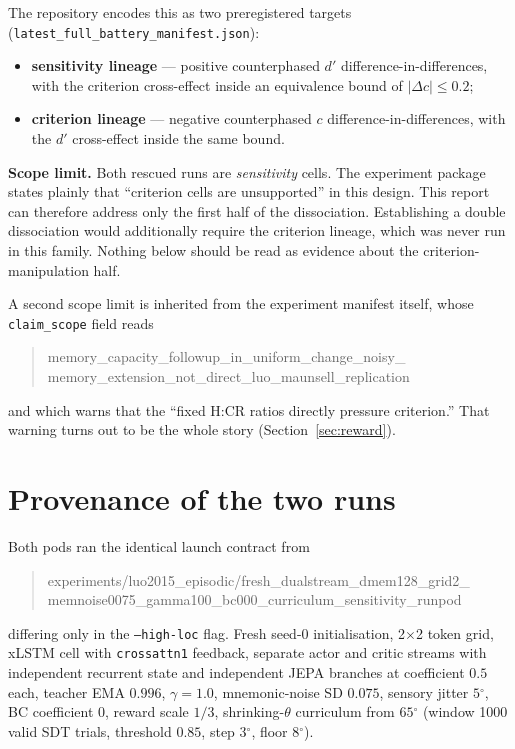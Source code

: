 \documentclass[11pt]{article}
\newcommand{\dprime}{d'}
\newcommand{\dc}{\Delta c}
\newcommand{\dg}{\ensuremath{^\circ}}
\begin{document}
The repository encodes this as two preregistered targets
(\texttt{latest\_full\_battery\_manifest.json}):

\begin{itemize}[leftmargin=1.4em,itemsep=1pt]
  \item \textbf{sensitivity lineage} --- positive counterphased $\dprime$
        difference-in-differences, with the criterion cross-effect inside an
        equivalence bound of $|\dc| \le 0.2$;
  \item \textbf{criterion lineage} --- negative counterphased $c$
        difference-in-differences, with the $\dprime$ cross-effect inside the same bound.
\end{itemize}

\noindent\textbf{Scope limit.} Both rescued runs are \emph{sensitivity} cells. The
experiment package states plainly that ``criterion cells are unsupported'' in this
design. This report can therefore address only the first half of the dissociation.
Establishing a double dissociation would additionally require the criterion lineage,
which was never run in this family. Nothing below should be read as evidence about the
criterion-manipulation half.

A second scope limit is inherited from the experiment manifest itself, whose
\texttt{claim\_scope} field reads

\begin{quote}\ttfamily\footnotesize
memory\_capacity\_followup\_in\_uniform\_change\_noisy\_\\
memory\_extension\_not\_direct\_luo\_maunsell\_replication
\end{quote}

\noindent and which warns that the ``fixed H:CR ratios directly pressure criterion.''
That warning turns out to be the whole story (Section~\ref{sec:reward}).

\section{Provenance of the two runs}

Both pods ran the identical launch contract from

\begin{quote}\ttfamily\footnotesize
experiments/luo2015\_episodic/fresh\_dualstream\_dmem128\_grid2\_\\
memnoise0075\_gamma100\_bc000\_curriculum\_sensitivity\_runpod
\end{quote}

\noindent differing only in the
\texttt{--high-loc} flag. Fresh seed-0 initialisation, 2$\times$2 token grid, xLSTM cell with
\texttt{crossattn1} feedback, separate actor and critic streams with independent
recurrent state and independent JEPA branches at coefficient $0.5$ each, teacher EMA
$0.996$, $\gamma = 1.0$, mnemonic-noise SD $0.075$, sensory jitter $5\dg$, BC
coefficient $0$, reward scale $1/3$, shrinking-$\theta$ curriculum from $65\dg$
(window 1000 valid SDT trials, threshold $0.85$, step $3\dg$, floor $8\dg$).
\end{document}
